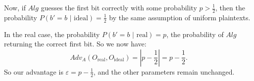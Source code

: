 \documentclass{article}
\begin{document}
Now, if $Alg$ guesses the first bit correctly with some probability $p>\frac{1}{2}$, then the probability $P(b'=b\text{ | ideal})=\frac{1}{2}$ by the same assumption of uniform plaintexts.

In the real case, the probability $P(b'=b\text{ | real})=p$, the probability of $Alg$ returning the correct first bit. So we now have:
\[
    Adv_A(O_{\text{real}},O_{\text{ideal}})= \left|p-\frac{1}{2}\right|=p-\frac{1}{2}
.\] 
So our advantage is $\varepsilon=p-\frac{1}{2}$, and the other parameters remain unchanged.
\end{document}

